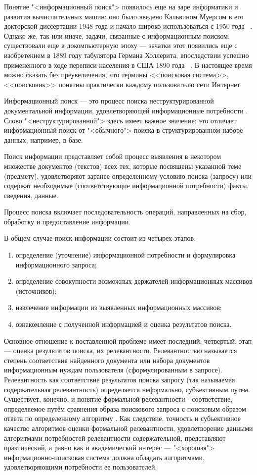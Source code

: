 Понятие "<информационный поиск"> появилось еще на заре информатики и развития вычислительных машин; оно было
введено Кальвином Муерсом в его докторской диссертации 1948 года и начало широко использоваться с 1950 года
~\cite{mooers1950theory, mooers1950information}. Однако же, так или иначе, задачи, связанные с информационным
поиском, существовали еще в докомпьютерную эпоху --- зачатки этот появились еще с изобретением в 1889 году
табулятора Германа Холлерита, впоследствии успешно примененного в ходе переписи населения в США 1890 года
~\cite{hollerith2011}. В настоящее время можно сказать без преувеличения, что термины <<поисковая система>>,
<<поисковик>> понятны практически каждому пользователю сети Интернет.

Информационный поиск --- это процесс поиска неструктурированной документальной информации, удовлетворяющей
информационные потребности \cite{manning2011wwedenie}. Слово "<неструктурированной"> здесь имеет важное значение:
это отличает информационный поиск от "<обычного"> поиска в структурированном наборе данных, например, в базе.

Поиск информации представляет собой процесс выявления в некотором множестве документов (текстов) всех тех,
которые посвящены указанной теме (предмету), удовлетворяют заранее определенному условию поиска (запросу)
или содержат необходимые (соответствующие информационной потребности) факты, сведения, данные.

Процесс поиска включает последовательность операций, направленных на сбор, обработку и предоставление информации.

В общем случае поиск информации состоит из четырех этапов:
\begin{enumerate}[1)]
    \item определение (уточнение) информационной потребности и формулировка информационного запроса;
    \item определение совокупности возможных держателей информационных массивов (источников);
    \item извлечение информации из выявленных информационных массивов;
    \item ознакомление с полученной информацией и оценка результатов поиска.
\end{enumerate}

Основное отношение к поставленной проблеме имеет последний, четвертый, этап --- оценка результатов поиска,
их релевантности. Релевантностью называется степень соответствия найденного документа или набора документов
информационным нуждам пользователя (сформулированным в запросе). Релевантность как соответствие результатов
поиска запросу (так называемая содержательная релевантность) определяется неформально, субъективным путем.
Существует, конечно, и понятие формальной релевантности - соответствие, определяемое путём сравнения образа
поискового запроса с поисковым образом ответа по определенному алгоритму \cite{mihalevich1989slowarj}.
Как следствие, точность и субъективное качество алгоритмов оценки формальной релевантности, удовлетворение
данными алгоритмами потребностей релевантности содержательной, представляют практический, а равно
как и академический интерес --- "<хорошая"> информационно-поисковая система должна обладать алгоритмами,
удовлетворяющими потребности ее пользователей.

